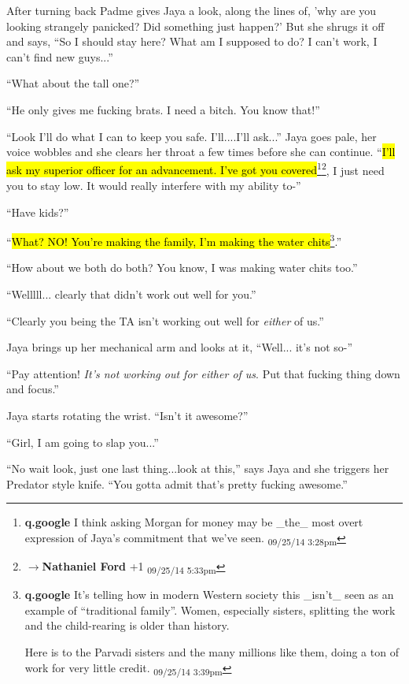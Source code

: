 After turning back Padme gives Jaya a look, along the lines of, 'why are you looking strangely panicked? Did something just happen?' But she shrugs it off and says, ``So I should stay here?  What am I supposed to do?  I can't work, I can't find new guys...''

``What about the tall one?''

``He only gives me fucking brats.  I need a bitch.  You know that!''

``Look I'll do what I can to keep you safe.  I'll....I'll ask...'' Jaya goes pale, her voice wobbles and she clears her throat a few times before she can continue. ``\hl{I'll ask my superior officer for an advancement.  I've got you covered}\footnote{\textbf{q.google }I think asking Morgan for money may be \_the\_ most overt expression of Jaya's commitment that we've seen. \textsubscript{09/25/14 3:28pm}}\footnote{$\rightarrow$\textbf{Nathaniel Ford }+1 \textsubscript{09/25/14 5:33pm}}, I just need you to stay low.  It would really interfere with my ability to-''

``Have kids?''

``\hl{What?  NO!  You're making the family, I'm making the water chits}\footnote{\textbf{q.google }It's telling how in modern Western society this \_isn't\_ seen as an example of ``traditional family''.  Women, especially sisters, splitting the work and the child-rearing is older than history.

Here is to the Parvadi sisters and the many millions like them, doing a ton of work for very little credit. \textsubscript{09/25/14 3:39pm}}.''

``How about we both do both?  You know, I was making water chits too.''

``Welllll... clearly that didn't work out well for you.''

``Clearly you being the TA isn't working out well for \textit{either} of us.''

Jaya brings up her mechanical arm and looks at it, ``Well... it's not so-''

``Pay attention!  \textit{It's not working out for either of us}.  Put that fucking thing down and focus.''

Jaya starts rotating the wrist.  ``Isn't it awesome?''

``Girl, I am going to slap you...''

``No wait look, just one last thing...look at this,'' says Jaya and she triggers her Predator style knife. ``You gotta admit that's pretty fucking awesome.''

